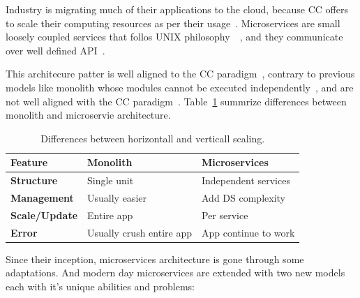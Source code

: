 Industry is migrating much of their applications to the cloud, because CC offers to scale their computing resources as per their usage~\cite{LiZJLZLGGS19}. Microservices are small loosely coupled services that follos UNIX philosophy~~\cite{krause2015microservices}, and they communicate over well defined API~\cite{DragoniGLMMMS16}.

This architecure patter is well aligned to the CC paradigm~\cite{LiZJLZLGGS19}, contrary to previous models like monolith whose modules cannot be executed independently~\cite{DragoniGLMMMS16, abs-1905-07997}, and are not well aligned with the CC paradigm~\cite{abs-1905-07997}. Table~\ref{tab:table3} summrize differences between monolith and microservie architecture.

\begin{table}[h!]
	\begin{center}
		\begin{tabular}{l|l|l}
			\textbf{Feature} & \textbf{Monolith} & \textbf{Microservices}\\
			\hline
			\textbf{Structure} & Single unit & Independent services \\
			\textbf{Management} & Usually easier & Add DS complexity\\
			\textbf{Scale/Update} & Entire app & Per service \\
			\textbf{Error} & Usually crush entire app & App continue to work \\
		\end{tabular}
	\end{center}
	\vspace{-0.5cm}
	\caption{Differences between horizontall and verticall scaling.}
	\label{tab:table3}
\end{table}

Since their inception, microservices architecture is gone through some adaptations. And modern day microservices are extended with two new models each with it's unique abilities and problems:


